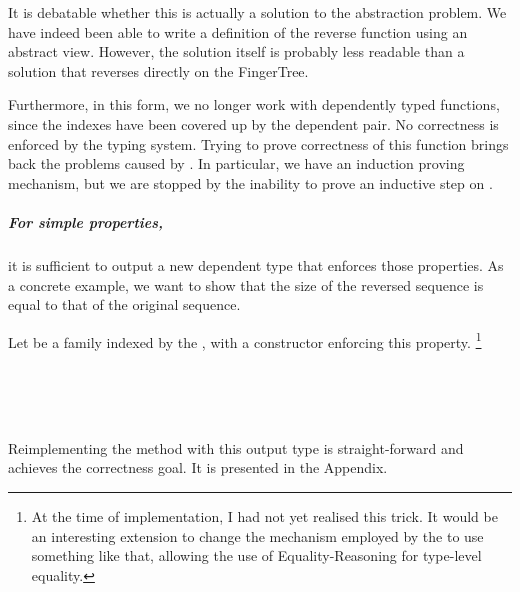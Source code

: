 \documentclass[12pt,twoside,notitlepage]{report}
\begin{document}
It is debatable whether this is actually a solution to the abstraction problem. We have indeed been able to write a definition of the reverse function using an abstract view. However, the solution itself is probably less readable than a solution that reverses directly on the FingerTree.

Furthermore, in this form, we no longer work with dependently typed functions, since the indexes have been covered up by the dependent pair. No correctness is enforced by the typing system. Trying to prove correctness of this function brings back the problems caused by . In particular, we have an induction proving mechanism, but we are stopped by the inability to prove an inductive step on .

\subparagraph{For simple properties,} it is sufficient to output a new dependent type that enforces those properties. As a concrete example, we want to show that the size of the reversed sequence is equal to that of the original sequence.

Let  be a family indexed by the , with a constructor enforcing this property. \footnote{At the time of implementation, I had not yet realised this trick. It would be an interesting extension to change the mechanism employed by the  to use something like that, allowing the use of Equality-Reasoning for type-level equality.}

\begin{code}
\\
\>[4]\<[6]%
\>[6]  \AgdaSymbol{:} \AgdaSymbol{(} \AgdaSymbol{:}  \AgdaSymbol{\{}\AgdaSymbol{\})}    \<%
\\
\>[6]\<[8]%
\>[8] \AgdaSymbol{:}  \AgdaSymbol{\{}\AgdaSymbol{\}} \AgdaSymbol{\{}\AgdaSymbol{\}}  \AgdaSymbol{(}  \AgdaSymbol{)}  \AgdaSymbol{(}  \AgdaSymbol{)}  \AgdaSymbol{(}  \AgdaSymbol{)}   \<%
\\
%
\end{code}

Reimplementing the  method with this output type is straight-forward and achieves the correctness goal. It is presented in the Appendix.
\end{document}
